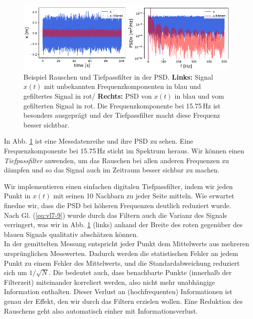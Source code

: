 \begin{figure}[htbp]
    \centering
        \includegraphics[width=\textwidth]{Figures/psd_fig3.pdf}
        \caption{Beispiel Rauschen und Tiefpassfilter in der PSD. \textbf{Links:} Signal $x(t)$ mit unbekannten Frequenzkomponenten in blau und gefiltertes Signal in rot/ \textbf{Rechts:} PSD von $x(t)$ in blau und vom gefilterten Signal in rot. Die Frequenzkomponente bei 15.75\,Hz ist besonders ausgeprägt und der Tiefpassfilter macht diese Frequenz besser sichtbar.}
        \label{fig:parseval}
\end{figure}

In Abb. \ref{fig:parseval} ist eine Messdatenreihe und ihre PSD zu sehen. Eine Frequenzkomponente bei 15.75\,Hz sticht im Spektrum heraus. Wir können einen \textit{Tiefpassfilter} anwenden, um das Rauschen bei allen anderen Frequenzen zu dämpfen und so das Signal auch im Zeitraum besser sichbar zu machen. 

Wir implementieren einen einfachen digitalen Tiefpassfilter, indem wir jeden Punkt in $x(t)$ mit seinen 10 Nachbarn zu jeder Seite mitteln. Wie erwartet finedne wir, dass die PSD bei höheren Frequenzen deutlich reduziert wurde.\\ 

Nach Gl. (\ref{eq:vl7-9}) wurde durch das Filtern auch die Varianz des Signals verringert, was wir in Abb. \ref{fig:parseval} (links) anhand der Breite des roten gegenüber des blauen Signals qualitativ abschätzen können. \\

In der gemittelten Messung entspricht jeder Punkt dem Mittelwerts aus mehreren ursprünglichen Messwerten. Dadurch werden die statistischen Fehler an jedem Punkt zu einem Fehler des Mittelwerts, und die Standardabweichung reduziert sich um $1/\sqrt{N}$. Die bedeutet auch, dass benachbarte Punkte (innerhalb der Filterzeit) miteinander korreliert werden, also nicht mehr unabhängige Information enthalten. Dieser Verlust an (hochfrequenten) Informationen ist genau der Effekt, den wir durch das Filtern erzielen wollen. Eine Reduktion des Rauschens geht also automatisch einher mit Informationsverlust.

